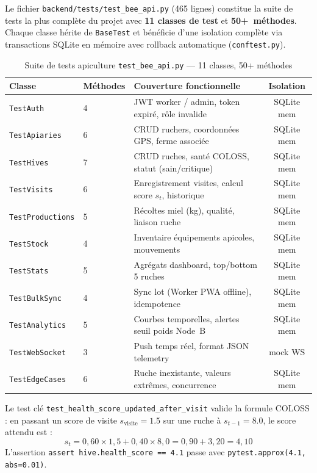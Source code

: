 Le fichier \texttt{backend/tests/test\_bee\_api.py} (465 lignes) constitue la suite
de tests la plus complète du projet avec \textbf{11 classes de test} et \textbf{50+~méthodes}.
Chaque classe hérite de \texttt{BaseTest} et bénéficie d'une isolation complète via
transactions SQLite en mémoire avec rollback automatique (\texttt{conftest.py}).

\begin{table}[H]
\caption{Suite de tests apiculture \texttt{test\_bee\_api.py} — 11 classes, 50+ méthodes}
\label{tab:bee_tests}
\centering
\begin{tabularx}{\textwidth}{@{}l l X c@{}}
\toprule
\textbf{Classe} & \textbf{Méthodes} & \textbf{Couverture fonctionnelle} & \textbf{Isolation} \\
\midrule
\texttt{TestAuth}         & 4  & JWT worker / admin, token expiré, rôle invalide & SQLite mem \\
\texttt{TestApiaries}     & 6  & CRUD ruchers, coordonnées GPS, ferme associée   & SQLite mem \\
\texttt{TestHives}        & 7  & CRUD ruches, santé COLOSS, statut (sain/critique) & SQLite mem \\
\texttt{TestVisits}       & 6  & Enregistrement visites, calcul score $s_t$, historique & SQLite mem \\
\texttt{TestProductions}  & 5  & Récoltes miel (kg), qualité, liaison ruche      & SQLite mem \\
\texttt{TestStock}        & 4  & Inventaire équipements apicoles, mouvements     & SQLite mem \\
\texttt{TestStats}        & 5  & Agrégats dashboard, top/bottom 5 ruches         & SQLite mem \\
\texttt{TestBulkSync}     & 4  & Sync lot (Worker PWA offline), idempotence      & SQLite mem \\
\texttt{TestAnalytics}    & 5  & Courbes temporelles, alertes seuil poids Node~B & SQLite mem \\
\texttt{TestWebSocket}    & 3  & Push temps réel, format JSON telemetry          & mock WS \\
\texttt{TestEdgeCases}    & 6  & Ruche inexistante, valeurs extrêmes, concurrence & SQLite mem \\
\bottomrule
\end{tabularx}
\end{table}

\noindent Le test clé \texttt{test\_health\_score\_updated\_after\_visit} valide la formule COLOSS :
en passant un score de visite $s_{\text{visite}} = 1.5$ sur une ruche à $s_{t-1} = 8.0$,
le score attendu est :
\[
s_t = 0{,}60 \times 1{,}5 + 0{,}40 \times 8{,}0 = 0{,}90 + 3{,}20 = 4{,}10
\]
L'assertion \texttt{assert hive.health\_score == 4.1} passe avec \texttt{pytest.approx(4.1, abs=0.01)}.

